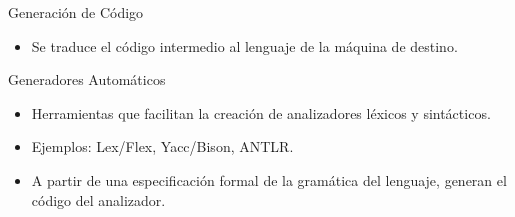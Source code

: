 \documentclass{beamer}
\begin{document}
	
	\begin{frame}{Generación de Código}
		
		\begin{itemize}
			\item Se traduce el código intermedio al lenguaje de la máquina de destino.
		\end{itemize}
		
	\end{frame}
	
	\begin{frame}{Generadores Automáticos}
		
		\begin{itemize}
			\item Herramientas que facilitan la creación de analizadores léxicos y sintácticos.
			\item Ejemplos: Lex/Flex, Yacc/Bison, ANTLR.
			\item A partir de una especificación formal de la gramática del lenguaje, generan el código del analizador.
		\end{itemize}
		
	\end{frame}
	
\end{document}
